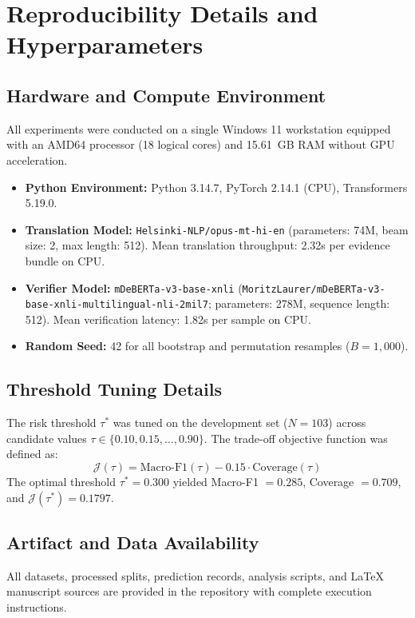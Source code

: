 \documentclass[11pt,a4paper]{article}
\begin{document}



\clearpage
\appendix
\section{Reproducibility Details and Hyperparameters}
\label{sec:appendix-reproducibility}

\subsection{Hardware and Compute Environment}
All experiments were conducted on a single Windows 11 workstation equipped with an AMD64 processor (18 logical cores) and 15.61~GB RAM without GPU acceleration.
\begin{itemize}
    \item \textbf{Python Environment:} Python 3.14.7, PyTorch 2.14.1 (CPU), Transformers 5.19.0.
    \item \textbf{Translation Model:} \texttt{Helsinki-NLP/opus-mt-hi-en} (parameters: 74M, beam size: 2, max length: 512). Mean translation throughput: 2.32s per evidence bundle on CPU.
    \item \textbf{Verifier Model:} \texttt{mDeBERTa-v3-base-xnli} (\texttt{MoritzLaurer/}\allowbreak\texttt{mDeBERTa-v3-base-}\allowbreak\texttt{xnli-multilingual-nli-2mil7}; parameters: 278M, sequence length: 512). Mean verification latency: 1.82s per sample on CPU.
    \item \textbf{Random Seed:} 42 for all bootstrap and permutation resamples ($B=1,000$).
\end{itemize}

\subsection{Threshold Tuning Details}
The risk threshold $\tau^*$ was tuned on the development set ($N=103$) across candidate values $\tau \in \{0.10, 0.15, \dots, 0.90\}$. The trade-off objective function was defined as:
\begin{equation}
    \mathcal{J}(\tau) = \text{Macro-F1}(\tau) - 0.15 \cdot \text{Coverage}(\tau)
\end{equation}
The optimal threshold $\tau^* = 0.300$ yielded Macro-F1 $= 0.285$, Coverage $= 0.709$, and $\mathcal{J}(\tau^*) = 0.1797$.

\subsection{Artifact and Data Availability}
All datasets, processed splits, prediction records, analysis scripts, and LaTeX manuscript sources are provided in the repository with complete execution instructions.
\end{document}
